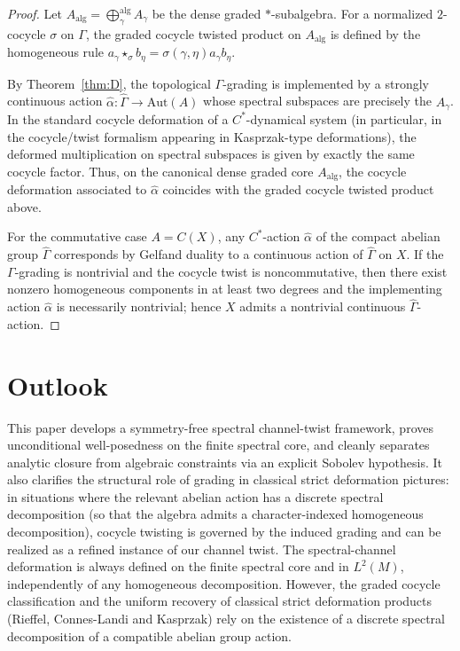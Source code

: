 \documentclass[11pt]{amsart}
\theoremstyle{plain}
\theoremstyle{definition}
\theoremstyle{remark}
\begin{document}
\begin{proof}
Let $A_{\mathrm{alg}}=\bigoplus_{\gamma}^{\mathrm{alg}}A_\gamma$ be the dense graded $*$-subalgebra.
For a normalized $2$-cocycle $\sigma$ on $\Gamma$, the graded cocycle twisted product on $A_{\mathrm{alg}}$ is defined by the homogeneous rule
$a_\gamma\star_\sigma b_\eta=\sigma(\gamma,\eta)a_\gamma b_\eta$.

By Theorem~\ref{thm:D}, the topological $\Gamma$-grading is implemented by a strongly continuous action
$\widehat\alpha:\widehat\Gamma\to\mathrm{Aut}(A)$ whose spectral subspaces are precisely the $A_\gamma$.
In the standard cocycle deformation of a $C^*$-dynamical system (in particular, in the cocycle/twist formalism
appearing in Kasprzak-type deformations), the deformed multiplication on spectral subspaces is given by exactly the same cocycle factor.
Thus, on the canonical dense graded core $A_{\mathrm{alg}}$, the cocycle deformation associated to $\widehat\alpha$
coincides with the graded cocycle twisted product above.

For the commutative case $A=C(X)$, any $C^*$-action $\widehat\alpha$ of the compact abelian group $\widehat\Gamma$
corresponds by Gelfand duality to a continuous action of $\widehat\Gamma$ on $X$.
If the $\Gamma$-grading is nontrivial and the cocycle twist is noncommutative, then there exist nonzero homogeneous components
in at least two degrees and the implementing action $\widehat\alpha$ is necessarily nontrivial; hence $X$ admits a nontrivial
continuous $\widehat\Gamma$-action.
\end{proof}

\section{Outlook}\label{sec:outlook}

This paper develops a symmetry-free spectral channel-twist framework, proves unconditional well-posedness on the finite spectral core,
and cleanly separates analytic closure from algebraic constraints via an explicit Sobolev hypothesis.  It also clarifies the structural role
of grading in classical strict deformation pictures: in situations where the relevant abelian action has a discrete spectral decomposition (so that the algebra admits a character-indexed homogeneous decomposition), cocycle twisting is governed by
the induced grading and can be realized as a refined instance of our channel twist. The spectral-channel deformation is always defined on the finite spectral core and in $L^2(M)$, independently of any homogeneous decomposition. However, the graded cocycle classification and the uniform recovery of classical strict deformation products (Rieffel, Connes-Landi and Kasprzak) rely on the existence of a discrete spectral decomposition of a compatible abelian group action.
\end{document}
